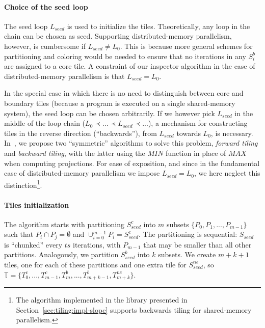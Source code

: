 \paragraph{Choice of the seed loop}
The seed loop $L_{seed}$ is used to initialize the tiles. Theoretically, any loop in the chain can be chosen as seed. Supporting distributed-memory parallelism, however, is cumbersome if $L_{seed} \neq L_0$. This is because more general schemes for partitioning and coloring would be needed to ensure that no iterations in any $S_i^{b}$ are assigned to a core tile. A constraint of our inspector algorithm in the case of distributed-memory parallelism is that $L_{seed} = L_0$. 

In the special case in which there is no need to distinguish between core and boundary tiles (because a program is executed on a single shared-memory system), the seed loop can be chosen arbitrarily. If we however pick $L_{seed}$ in the middle of the loop chain ($L_0 \prec ... \prec L_{seed} \prec ...$), a mechanism for constructing tiles in the reverse direction (``backwards''), from $L_{seed}$ towards $L_0$, is necessary. In~\cite{st-paper}, we propose two ``symmetric'' algorithms to solve this problem, \textit{forward tiling} and \textit{backward tiling}, with the latter using the $MIN$ function in place of $MAX$ when computing projections. For ease of exposition, and since in the fundamental case of distributed-memory parallelism we impose $L_{seed} = L_0$, we here neglect this distinction\footnote{The algorithm implemented in the library presented in Section~\ref{sec:tiling:impl-slope} supports backwards tiling for shared-memory parallelism.}. 


\paragraph{Tiles initialization}
The algorithm starts with partitioning $S_{seed}^{c}$ into $m$ subsets $\lbrace P_0, P_1, ..., P_{m-1}\rbrace$ such that $P_i \cap P_j = \emptyset$ and $\cup_{i = 0}^{m-1} P_i = S_{seed}^{c}$. The partitioning is sequential: $S_{seed}$ is ``chunked'' every $ts$ iterations, with $P_{m-1}$ that may be smaller than all other partitions. Analogously, we partition $S_{seed}^{b}$ into $k$ subsets. We create $m+k+1$ tiles, one for each of these partitions and one extra tile for $S_{seed}^{ne}$, so $\mathbb{T} = \lbrace T_0^c, ..., T_{m-1}^c, T_m^{b}, ..., T_{m+k-1}^b, T_{m+k}^{ne} \rbrace$. 

